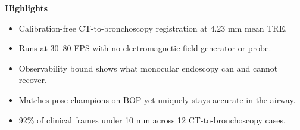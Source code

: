 \documentclass{article}
\begin{document}
\begin{center}\textbf{Highlights}\end{center}
\begin{itemize}
\item Calibration-free CT-to-bronchoscopy registration at 4.23 mm mean TRE.
\item Runs at 30--80 FPS with no electromagnetic field generator or probe.
\item Observability bound shows what monocular endoscopy can and cannot recover.
\item Matches pose champions on BOP yet uniquely stays accurate in the airway.
\item 92\% of clinical frames under 10 mm across 12 CT-to-bronchoscopy cases.
\end{itemize}
\end{document}
